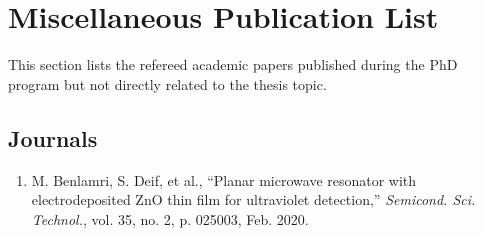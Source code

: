 \section*{Miscellaneous Publication List}
This section lists the refereed academic papers published during the PhD program but not directly related to the thesis topic.

\subsection*{Journals}
\begin{enumerate}
	\item M. Benlamri, S. Deif, et al., “Planar microwave resonator with electrodeposited ZnO thin film for ultraviolet detection,” \textit{Semicond. Sci. Technol.}, vol. 35, no. 2, p. 025003, Feb. 2020.
\end{enumerate}





\printreferences 

\bigskip 
\clearpage\singlespacing